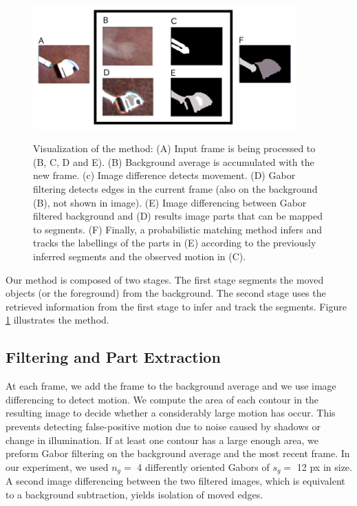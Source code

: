 \documentclass{article}
\begin{document}
\begin{figure}[tbp]
\begin{center}
\caption{Visualization of the method: (A) Input frame is being processed to (B, C, D and E). (B) Background average is accumulated with the new frame. (c) Image difference detects movement. (D) Gabor filtering detects edges in the current frame (also on the background (B), not shown in image). (E) Image differencing between Gabor filtered background and (D) results image parts that can be mapped to segments. (F) Finally, a probabilistic matching method infers and tracks the labellings of the parts in (E) according to the previously inferred segments and the observed motion in (C).}
  \includegraphics[width=0.9\textwidth]{1}
\label{figure:model_seq}
\end{center}
\end{figure}

Our method is composed of two stages. The first stage segments the moved objects (or the foreground) from the background. The second stage uses the retrieved information from the first stage to infer and track the segments. Figure \ref{figure:model_seq} illustrates the method.

\subsection{Filtering and Part Extraction}

At each frame, we add the frame to the background average and we use image differencing to detect motion. We compute the area of each contour in the resulting image to decide whether a considerably large motion has occur. This prevents detecting false-positive motion due to noise caused by shadows or change in illumination. If at least one contour has a large enough area, we preform Gabor filtering on the background average and the most recent frame. In our experiment, we used $n_g=$ 4 differently oriented Gabors of $s_g=$ 12 px in size. A second image differencing between the two filtered images, which is equivalent to a background subtraction, yields isolation of moved edges. 
\end{document}
